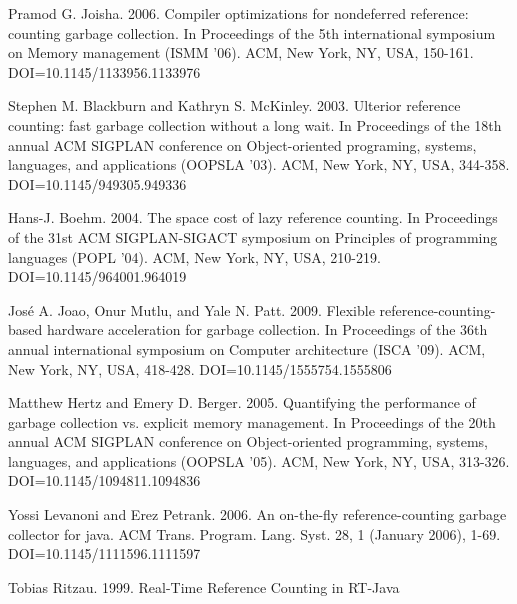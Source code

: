 \documentclass{sigplanconf}
\begin{document}
\begin{thebibliography}{}
\softraggedright
{}
Pramod G. Joisha. 2006. Compiler optimizations for nondeferred reference: counting garbage collection. In Proceedings of the 5th international symposium on Memory management (ISMM '06). ACM, New York, NY, USA, 150-161. DOI=10.1145/1133956.1133976

Stephen M. Blackburn and Kathryn S. McKinley. 2003. Ulterior reference counting: fast garbage collection without a long wait. In Proceedings of the 18th annual ACM SIGPLAN conference on Object-oriented programing, systems, languages, and applications (OOPSLA '03). ACM, New York, NY, USA, 344-358. DOI=10.1145/949305.949336

Hans-J. Boehm. 2004. The space cost of lazy reference counting. In Proceedings of the 31st ACM SIGPLAN-SIGACT symposium on Principles of programming languages (POPL '04). ACM, New York, NY, USA, 210-219. DOI=10.1145/964001.964019 

José A. Joao, Onur Mutlu, and Yale N. Patt. 2009. Flexible reference-counting-based hardware acceleration for garbage collection. In Proceedings of the 36th annual international symposium on Computer architecture (ISCA '09). ACM, New York, NY, USA, 418-428. DOI=10.1145/1555754.1555806

Matthew Hertz and Emery D. Berger. 2005. Quantifying the performance of garbage collection vs. explicit memory management. In Proceedings of the 20th annual ACM SIGPLAN conference on Object-oriented programming, systems, languages, and applications (OOPSLA '05). ACM, New York, NY, USA, 313-326. DOI=10.1145/1094811.1094836  

Yossi Levanoni and Erez Petrank. 2006. An on-the-fly reference-counting garbage collector for java. ACM Trans. Program. Lang. Syst. 28, 1 (January 2006), 1-69. DOI=10.1145/1111596.1111597 

Tobias Ritzau. 1999.  Real-Time Reference Counting in RT-Java

\end{thebibliography}
\end{document}
